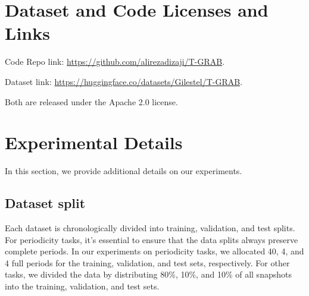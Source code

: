 

\section{Dataset and Code Licenses and Links} \label{appendix:licenses}
Code Repo link:  \url{https://github.com/alirezadizaji/T-GRAB}.

\noindent Dataset link: \url{https://huggingface.co/datasets/Gilestel/T-GRAB}.

\noindent Both are released under the Apache 2.0 license.


\section{Experimental Details}\label{appendix:experimental-details}
In this section, we provide additional details on our experiments.
\subsection{Dataset split}
Each dataset is chronologically divided into training, validation, and test splits. For periodicity tasks, it’s essential to ensure that the data splits always preserve complete periods. In our experiments on periodicity tasks, we allocated 40, 4, and 4 full periods for the training, validation, and test sets, respectively. For other tasks, we divided the data by distributing 80\%, 10\%, and 10\% of all snapshots into the training, validation, and test sets.


